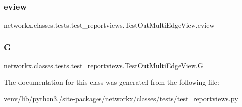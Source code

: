 \subsubsection{\texorpdfstring{eview}{eview}}
{\footnotesize\ttfamily networkx.\+classes.\+tests.\+test\+\_\+reportviews.\+Test\+Out\+Multi\+Edge\+View.\+eview}

\mbox{\label{classnetworkx_1_1classes_1_1tests_1_1test__reportviews_1_1TestOutMultiEdgeView_a09997825eda6622dc9298799c5843bfd}} 
\subsubsection{\texorpdfstring{G}{G}}
{\footnotesize\ttfamily networkx.\+classes.\+tests.\+test\+\_\+reportviews.\+Test\+Out\+Multi\+Edge\+View.\+G}



The documentation for this class was generated from the following file\+:\begin{DoxyCompactItemize}
\item 
venv/lib/python3./site-\/packages/networkx/classes/tests/\hyperlink{test__reportviews_8py}{test\+\_\+reportviews.\+py}\end{DoxyCompactItemize}
